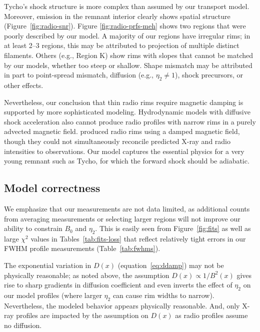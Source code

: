 \documentclass[iop, apj, numberedappendix]{emulateapj}
\begin{document}
Tycho's shock structure is more complex than assumed by our transport model.
Moreover, emission in the remnant interior clearly shows spatial structure
(Figure~\ref{fig:radio-snr}).  Figure \ref{fig:radio-prfs-meh} shows two
regions that were poorly described by our model.  A majority of our regions
have irregular rims; in at least 2--3 regions, this may be attributed to
projection of multiple distinct filaments.  Others (e.g., Region K) show rims
with slopes that cannot be matched by our models, whether too steep or
shallow.  Shape mismatch may be attributed in part to point-spread mismatch,
diffusion (e.g., $\eta_2 \neq 1$), shock precursors, or other effects.

Nevertheless, our conclusion that thin radio rims require magnetic damping is
supported by more sophisticated modeling.  Hydrodynamic models with diffusive
shock acceleration \citep{cassam-chenai2007, slane2014} also cannot produce
radio profiles with narrow rims in a purely advected magnetic field.
\citet{cassam-chenai2007} produced radio rims using a damped magnetic field,
though they could not simultaneously reconcile predicted X-ray and radio
intensities to observations.  Our model captures the essential physics for a
very young remnant such as Tycho, for which the forward shock should be
adiabatic.


\subsection{Model correctness}

We emphasize that our measurements are not data limited, as additional counts
from averaging measurements or selecting larger regions will not improve our
ability to constrain $B_0$ and $\eta_2$.  This is easily seen from
Figure~\ref{fig:fits} as well as large $\chi^2$ values in
Tables~\ref{tab:fits-loss} that reflect relatively tight errors in our FWHM
profile measurements (Table~\ref{tab:fwhms}).

The exponential variation in $D(x)$ (equation~\eqref{eq:ddamp}) may not be
physically reasonable; as noted above, the assumption $D(x)
\propto 1 / B^2(x)$ gives rise to sharp gradients in diffusion coefficient and
even inverts the effect of $\eta_2$ on our model profiles (where larger
$\eta_2$ can cause rim widths to narrow).  Nevertheless, the modeled behavior
appears physically reasonable.  And, only X-ray profiles are impacted by the
assumption on $D(x)$ as radio profiles assume no diffusion.
\end{document}

